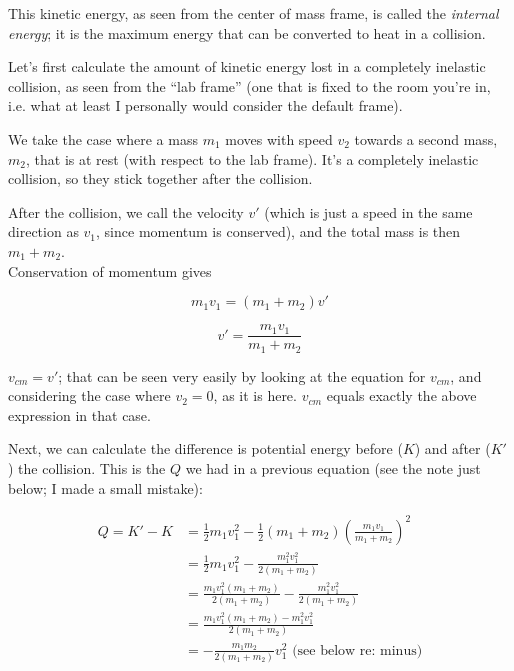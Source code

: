 This kinetic energy, as seen from the center of mass frame, is called the \emph{internal energy}; it is the maximum energy that can be converted to heat in a collision.

Let's first calculate the amount of kinetic energy lost in a completely inelastic collision, as seen from the ``lab frame'' (one that is fixed to the room you're in, i.e. what at least I personally would consider the default frame).

We take the case where a mass $m_1$ moves with speed $v_2$ towards a second mass, $m_2$, that is at rest (with respect to the lab frame). It's a completely inelastic collision, so they stick together after the collision.

After the collision, we call the velocity $v'$ (which is just a speed in the same direction as $v_1$, since momentum is conserved), and the total mass is then $m_1 + m_2$.\\
Conservation of momentum gives

\begin{equation}
m_1 v_1 = (m_1 + m_2) v'
\end{equation}

\begin{equation}
v' = \frac{m_1 v_1}{m_1 + m_2}
\end{equation}

$v_{cm} = v'$; that can be seen very easily by looking at the equation for $v_{cm}$, and considering the case where $v_2 = 0$, as it is here. $v_{cm}$ equals exactly the above expression in that case.

Next, we can calculate the difference is potential energy before ($K$) and after ($K'$) the collision. This is the $Q$ we had in a previous equation (see the note just below; I made a small mistake):

\begin{align}
Q = K' - K &= \frac{1}{2} m_1 v_1^2 - \frac{1}{2} (m_1 + m_2) \left(\frac{m_1 v_1}{m_1 + m_2}\right)^2\\
           &= \frac{1}{2} m_1 v_1^2 - \frac{m_1^2 v_1^2}{2(m_1 + m_2)}\\
           &= \frac{m_1 v_1^2(m_1 + m_2)}{2(m_1 + m_2)} - \frac{m_1^2 v_1^2}{2(m_1 + m_2)}\\
           &= \frac{m_1 v_1^2(m_1 + m_2) - m_1^2 v_1^2}{2(m_1 + m_2)}\\
           &= - \frac{m_1 m_2}{2(m_1 + m_2)} v_1^2 \text{ (see below re: minus)}
\end{align}

